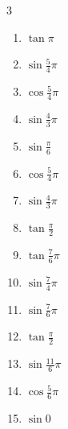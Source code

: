 \begin{multicols}{3}
\begin{enumerate}
  \item $\displaystyle \tan{\pi}$
        \phantom{$\displaystyle =0$}

  \item $\displaystyle \sin{\frac{5}{4}\pi}$

  \item $\displaystyle \cos{\frac{5}{4}\pi}$

  \item $\displaystyle \sin{\frac{4}{3}\pi}$

  \item $\displaystyle \sin{\frac{\pi}{6}}$

  \item $\displaystyle \cos{\frac{5}{4}\pi}$

  \item $\displaystyle \sin{\frac{4}{3}\pi}$

  \item $\displaystyle \tan{\frac{\pi}{2}}$
        \phantom{$\displaystyle \quad なし$}

  \item $\displaystyle \tan{\frac{7}{6}\pi}$

  \item $\displaystyle \sin{\frac{7}{4}\pi}$

  \item $\displaystyle \sin{\frac{7}{6}\pi}$

  \item $\displaystyle \tan{\frac{\pi}{2}}$
        \phantom{$\displaystyle \quad なし$}

  \item $\displaystyle \sin{\frac{11}{6}\pi}$

  \item $\displaystyle \cos{\frac{5}{6}\pi}$

  \item $\displaystyle \sin{0}$
        \phantom{$\displaystyle =0$}


\end{enumerate}
\end{multicols}
